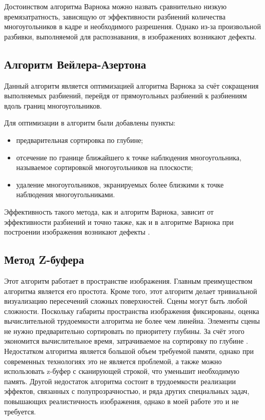 \documentclass[a4paper,14pt]{report}
\begin{document}
     Достоинством алгоритма Варнока можно назвать сравнительно низкую времязатратность, зависящую от эффективности разбиений количества многоугольников в кадре и необходимого разрешения. Однако из-за произвольной разбивки, выполняемой для распознавания, в изображениях возникают дефекты.


\subsection{Алгоритм Вейлера-Азертона} 
\par
    Данный алгоритм является оптимизацией алгоритма Варнока за счёт сокращения выполняемых разбиений, перейдя от прямоугольных разбиений к разбиениям вдоль границ многоугольников.

Для оптимизации в алгоритм были добавлены пункты:
\begin{itemize}
\item предварительная сортировка по глубине;

\item отсечение по границе ближайшего к точке наблюдения многоугольника, называемое сортировкой многоугольников на плоскости;

\item удаление многоугольников, экранируемых более близкими к точке наблюдения многоугольниками.

\end{itemize}
    Эффективность такого метода, как и алгоритм Варнока, зависит от эффективности разбиений и точно также, как и в алгоритме Варнока при построении изображения возникают дефекты \cite{alg2}.
  
\subsection{Метод Z-буфера}
\par
Этот алгоритм работает в пространстве изображения. Главным преимуществом алгоритма является его простота. Кроме того, этот алгоритм делает тривиальной визуализацию пересечений сложных поверхностей. Сцены могут быть любой сложности. Поскольку габариты пространства изображения фиксированы, оценка вычислительной трудоемкости алгоритма не более чем линейна. Элементы сцены не нужно предварительно сортировать по приоритету глубины. За счёт этого экономится вычислительное время, затрачиваемое на сортировку по глубине \cite{alg}.
Недостатком алгоритма является большой объем требуемой памяти, однако при современных технологиях это не является проблемой, а также можно использовать z-буфер с сканирующей строкой, что уменьшит необходимую память. 
Другой недостаток алгоритма состоит в трудоемкости реализации эффектов, связанных с полупрозрачностью, и ряда других специальных задач, повышающих реалистичность изображения, однако в моей работе это и не требуется. 
\end{document}
